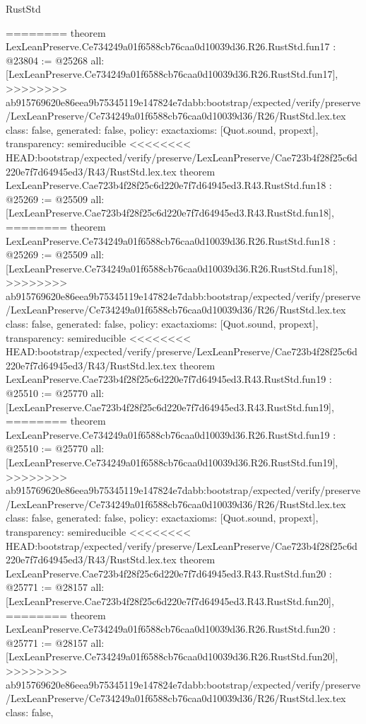\begin{lexlean}{RustStd}
\begin{coremodule}
{\begin{coremodule}
{{{{{{{{{{{{{{{{{{{{========
theorem LexLeanPreserve.Ce734249a01f6588cb76caa0d10039d36.R26.RustStd.fun17 : @23804 := @25268 {
  all: [LexLeanPreserve.Ce734249a01f6588cb76caa0d10039d36.R26.RustStd.fun17],
>>>>>>>> ab915769620e86eea9b75345119e147824e7dabb:bootstrap/expected/verify/preserve/LexLeanPreserve/Ce734249a01f6588cb76caa0d10039d36/R26/RustStd.lex.tex
  class: false,
  generated: false,
  policy: exact{axioms: [Quot.sound, propext]},
  transparency: semireducible
}
<<<<<<<< HEAD:bootstrap/expected/verify/preserve/LexLeanPreserve/Cae723b4f28f25c6d220e7f7d64945ed3/R43/RustStd.lex.tex
theorem LexLeanPreserve.Cae723b4f28f25c6d220e7f7d64945ed3.R43.RustStd.fun18 : @25269 := @25509 {
  all: [LexLeanPreserve.Cae723b4f28f25c6d220e7f7d64945ed3.R43.RustStd.fun18],
========
theorem LexLeanPreserve.Ce734249a01f6588cb76caa0d10039d36.R26.RustStd.fun18 : @25269 := @25509 {
  all: [LexLeanPreserve.Ce734249a01f6588cb76caa0d10039d36.R26.RustStd.fun18],
>>>>>>>> ab915769620e86eea9b75345119e147824e7dabb:bootstrap/expected/verify/preserve/LexLeanPreserve/Ce734249a01f6588cb76caa0d10039d36/R26/RustStd.lex.tex
  class: false,
  generated: false,
  policy: exact{axioms: [Quot.sound, propext]},
  transparency: semireducible
}
<<<<<<<< HEAD:bootstrap/expected/verify/preserve/LexLeanPreserve/Cae723b4f28f25c6d220e7f7d64945ed3/R43/RustStd.lex.tex
theorem LexLeanPreserve.Cae723b4f28f25c6d220e7f7d64945ed3.R43.RustStd.fun19 : @25510 := @25770 {
  all: [LexLeanPreserve.Cae723b4f28f25c6d220e7f7d64945ed3.R43.RustStd.fun19],
========
theorem LexLeanPreserve.Ce734249a01f6588cb76caa0d10039d36.R26.RustStd.fun19 : @25510 := @25770 {
  all: [LexLeanPreserve.Ce734249a01f6588cb76caa0d10039d36.R26.RustStd.fun19],
>>>>>>>> ab915769620e86eea9b75345119e147824e7dabb:bootstrap/expected/verify/preserve/LexLeanPreserve/Ce734249a01f6588cb76caa0d10039d36/R26/RustStd.lex.tex
  class: false,
  generated: false,
  policy: exact{axioms: [Quot.sound, propext]},
  transparency: semireducible
}
<<<<<<<< HEAD:bootstrap/expected/verify/preserve/LexLeanPreserve/Cae723b4f28f25c6d220e7f7d64945ed3/R43/RustStd.lex.tex
theorem LexLeanPreserve.Cae723b4f28f25c6d220e7f7d64945ed3.R43.RustStd.fun20 : @25771 := @28157 {
  all: [LexLeanPreserve.Cae723b4f28f25c6d220e7f7d64945ed3.R43.RustStd.fun20],
========
theorem LexLeanPreserve.Ce734249a01f6588cb76caa0d10039d36.R26.RustStd.fun20 : @25771 := @28157 {
  all: [LexLeanPreserve.Ce734249a01f6588cb76caa0d10039d36.R26.RustStd.fun20],
>>>>>>>> ab915769620e86eea9b75345119e147824e7dabb:bootstrap/expected/verify/preserve/LexLeanPreserve/Ce734249a01f6588cb76caa0d10039d36/R26/RustStd.lex.tex
  class: false,
}}}}}}}}}}}}}}}}}}}}}}}}
\end{coremodule}}
\end{coremodule}
\end{lexlean}
